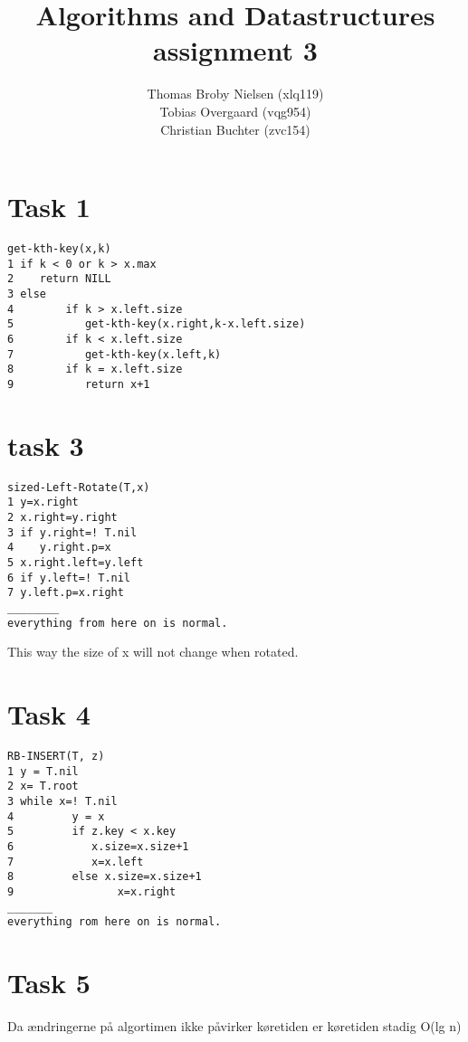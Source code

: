 \documentclass[12pt]{article}
\title{Algorithms and Datastructures assignment 3}
\author{Thomas Broby Nielsen (xlq119)\\ Tobias Overgaard (vqg954)\\ Christian Buchter (zvc154)}
\begin{document}
\maketitle

\tableofcontents

\pagebreak
\section{Task 1}
\begin{verbatim}
get-kth-key(x,k)
1 if k < 0 or k > x.max
2    return NILL
3 else
4        if k > x.left.size
5           get-kth-key(x.right,k-x.left.size)
6        if k < x.left.size
7           get-kth-key(x.left,k)
8        if k = x.left.size
9           return x+1
\end{verbatim}

\newpage
\section{task 3}
\begin{verbatim}
sized-Left-Rotate(T,x)
1 y=x.right
2 x.right=y.right
3 if y.right=! T.nil
4    y.right.p=x
5 x.right.left=y.left
6 if y.left=! T.nil
7 y.left.p=x.right
________
everything from here on is normal.
\end{verbatim}
This way the size of x will not change when rotated.
\newpage

\section{Task 4}
\begin{verbatim}
RB-INSERT(T, z)
1 y = T.nil
2 x= T.root
3 while x=! T.nil
4         y = x
5         if z.key < x.key
6            x.size=x.size+1
7            x=x.left
8         else x.size=x.size+1
9                x=x.right
_______
everything rom here on is normal.
\end{verbatim}
\newpage

\section{Task 5}
Da ændringerne på algortimen ikke påvirker køretiden er køretiden stadig O(lg n)
\end{document}
